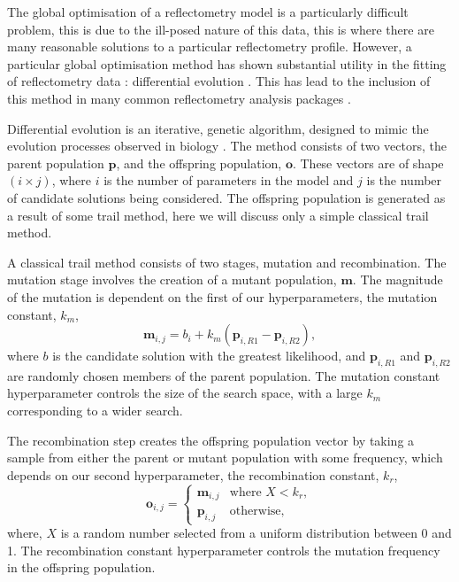 \documentclass[
 reprint,
 superscriptaddress,
 amsmath,amssymb,
 aps,
]{revtex4-1}
\begin{document}
The global optimisation of a reflectometry model is a particularly difficult problem, this is due to the ill-posed nature of this data, this is where there are many reasonable solutions to a particular reflectometry profile.
However, a particular global optimisation method has shown substantial utility in the fitting of reflectometry data \cite{varderlee_comparison_2007}: differential evolution \cite{StornPrice_1997_DE,wormington_characterization_1999}.
This has lead to the inclusion of this method in many common reflectometry analysis packages \cite{bjorck_fitting_2011}.


Differential evolution is an iterative, genetic algorithm, designed to mimic the evolution processes observed in biology \cite{holland_adaptation_1992}.
The method consists of two vectors, the parent population $\mathbf{p}$, and the offspring population, $\mathbf{o}$.
These vectors are of shape $(i \times j)$, where $i$ is the number of parameters in the model and $j$ is the number of candidate solutions being considered.
The offspring population is generated as a result of some trail method, here we will discuss only a simple classical trail method.

A classical trail method consists of two stages, mutation and recombination.
The mutation stage involves the creation of a mutant population, $\mathbf{m}$.
The magnitude of the mutation is dependent on the first of our hyperparameters, the mutation constant, $k_m$,
%
\begin{equation}
    \mathbf{m}_{i,j} = b_i + k_m (\mathbf{p}_{i, R1} - \mathbf{p}_{i, R2}),
\end{equation}
%
where $b$ is the candidate solution with the greatest likelihood, and $\mathbf{p}_{i, R1}$ and $\mathbf{p}_{i, R2}$ are randomly chosen members of the parent population.
The mutation constant hyperparameter controls the size of the search space, with a large $k_m$ corresponding to a wider search.

The recombination step creates the offspring population vector by taking a sample from either the parent or mutant population with some frequency, which depends on our second hyperparameter, the recombination constant, $k_r$,
%
\begin{equation}
    \mathbf{o}_{i, j} =
    \begin{cases}
        \mathbf{m}_{i, j} & \text{where } X < k_r,\\
        \mathbf{p}_{i, j} & \text{otherwise},
    \end{cases}
\end{equation}
%
where, $X$ is a random number selected from a uniform distribution between 0 and 1.
The recombination constant hyperparameter controls the mutation frequency in the offspring population.
\end{document}
